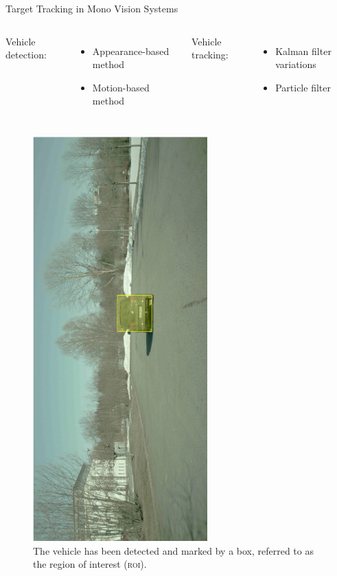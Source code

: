 \documentclass{beamer}
\newcommand{\roi}{\textsc{roi}\xspace}
\begin{document}
\begin{frame}{Target Tracking in Mono Vision Systems}
	\begin{columns}[T]
	Vehicle detection:
	\begin{itemize}
		\item Appearance-based method
		\item Motion-based method
	\end{itemize}
	Vehicle tracking:
	\begin{itemize}
		\item Kalman filter variations
		\item Particle filter
	\end{itemize}
	\end{columns}
	\vfill
	\begin{figure}
		\centering
		\includegraphics[angle=-90,origin=c,trim={0 0 15cm 0},width=0.6\textwidth]{roi_example}
		\caption{The vehicle has been detected and marked by a box, referred to as the region of interest (\roi).}
	\end{figure}
\end{frame}
\end{document}
